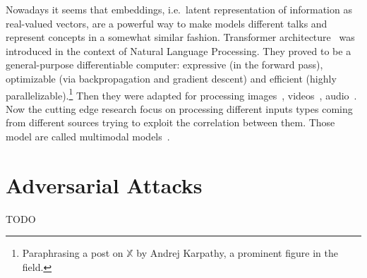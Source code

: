Nowadays it seems that embeddings, i.e.\ latent representation of information as
real-valued vectors, are a powerful way to make models different talks and
represent concepts in a somewhat similar fashion. Transformer
architecture~\cite{AttentionIsAlVaswan2017} was introduced in the context of
Natural Language Processing. They proved to be a general-purpose differentiable
computer: expressive (in the forward pass), optimizable (via backpropagation
and gradient descent) and efficient (highly
parallelizable).\footnote{Paraphrasing a post on $\mathbb{X}$ by Andrej
Karpathy, a prominent figure in the field.} Then they were adapted for
processing images~\cite{ImageTransformParmar2018, EndToEndObjeCarion2020,
AnImageIsWorDosovi2020}, videos~\cite{VivitAVideoArnab2021,
TemporalContexShao2020}, audio~\cite{NeuralSpeechSLiNa2018,
SpeechTransforDong2018, ConformerConvGulati2020}. Now the cutting edge research
focus on processing different inputs types coming from different sources trying
to exploit the correlation between them. Those model are called multimodal
models~\cite{ASurveyOnMulYinS2023}.


\section{Adversarial Attacks}
\label{sec:adversarial-attacks-related-work}
TODO
